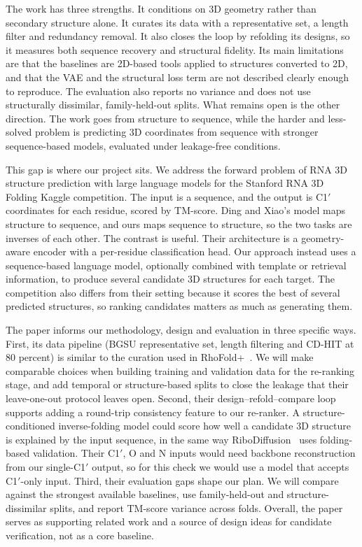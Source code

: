 \documentclass{FastFyp}
\begin{document}
The work has three strengths. It conditions on 3D geometry rather than secondary structure alone. It curates its data with a representative set, a length filter and redundancy removal. It also closes the loop by refolding its designs, so it measures both sequence recovery and structural fidelity. Its main limitations are that the baselines are 2D-based tools applied to structures converted to 2D, and that the VAE and the structural loss term are not described clearly enough to reproduce. The evaluation also reports no variance and does not use structurally dissimilar, family-held-out splits. What remains open is the other direction. The work goes from structure to sequence, while the harder and less-solved problem is predicting 3D coordinates from sequence with stronger sequence-based models, evaluated under leakage-free conditions.

This gap is where our project sits. We address the forward problem of RNA 3D structure prediction with large language models for the Stanford RNA 3D Folding Kaggle competition. The input is a sequence, and the output is C1$'$ coordinates for each residue, scored by TM-score. Ding and Xiao's model maps structure to sequence, and ours maps sequence to structure, so the two tasks are inverses of each other. The contrast is useful. Their architecture is a geometry-aware encoder with a per-residue classification head. Our approach instead uses a sequence-based language model, optionally combined with template or retrieval information, to produce several candidate 3D structures for each target. The competition also differs from their setting because it scores the best of several predicted structures, so ranking candidates matters as much as generating them.

The paper informs our methodology, design and evaluation in three specific ways. First, its data pipeline (BGSU representative set, length filtering and CD-HIT at 80 percent) is similar to the curation used in RhoFold+~\cite{ref:Shen:2024}. We will make comparable choices when building training and validation data for the re-ranking stage, and add temporal or structure-based splits to close the leakage that their leave-one-out protocol leaves open. Second, their design--refold--compare loop supports adding a round-trip consistency feature to our re-ranker. A structure-conditioned inverse-folding model could score how well a candidate 3D structure is explained by the input sequence, in the same way RiboDiffusion~\cite{huang2024ribodiffusion} uses folding-based validation. Their C1$'$, O and N inputs would need backbone reconstruction from our single-C1$'$ output, so for this check we would use a model that accepts C1$'$-only input. Third, their evaluation gaps shape our plan. We will compare against the strongest available baselines, use family-held-out and structure-dissimilar splits, and report TM-score variance across folds. Overall, the paper serves as supporting related work and a source of design ideas for candidate verification, not as a core baseline.
\end{document}
